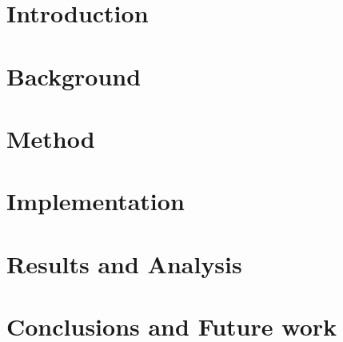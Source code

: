 \documentclass[nomenclature, english, bibtex]{kththesis}
\newcommand*{\engExpl}[1]{\todo[inline, backgroundcolor=kth-lightgreen40]{#1}} %
\begin{document}
\chapter{Introduction}
    \label{ch:introduction}
    

\cleardoublepage

\chapter{Background}
    \label{ch:background}
    

\cleardoublepage

\chapter{Method}
    \label{ch:method}
    

\cleardoublepage
\chapter{Implementation}
    \label{ch:implementation}
    

\cleardoublepage

\chapter{Results and Analysis}
    \label{ch:results_and_analysis}
    

\cleardoublepage

\chapter{Conclusions and Future work}
    \label{ch:conclusions_and_future_work}
    

\end{document}
